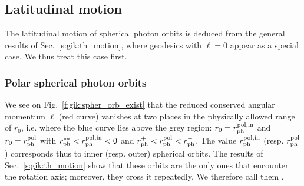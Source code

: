 \subsection{Latitudinal motion} \label{s:gik:spher_latitudinal}

The latitudinal motion of spherical photon orbits is
deduced from the general results of Sec.~\ref{s:gik:th_motion},
where geodesics with $\ell=0$ appear as a special case. We thus treat this
case first.

\subsubsection{Polar spherical photon orbits}

We see on Fig.~\ref{f:gik:spher_orb_exist} that the reduced conserved
angular momentum $\ell$ (red curve) vanishes at two
places in the physically allowed range of $r_0$,
i.e. where the blue curve lies above the grey region:
$r_0=r_{\rm ph}^{\rm pol,in}$ and $r_0=r_{\rm ph}^{\rm pol}$
with $r_{\rm ph}^{**} < r_{\rm ph}^{\rm pol,in} < 0$ and
$r_{\rm ph}^+ < r_{\rm ph}^{\rm pol} < r_{\rm ph}^-$.
The value $r_{\rm ph}^{\rm pol,in}$ (resp. $r_{\rm ph}^{\rm pol}$)
corresponds thus to inner (resp. outer) spherical orbits.
The results of Sec.~\ref{s:gik:th_motion} show that these orbits
are the only ones that encounter the rotation axis; moreover, they
cross it repeatedly.
We therefore call them
.

